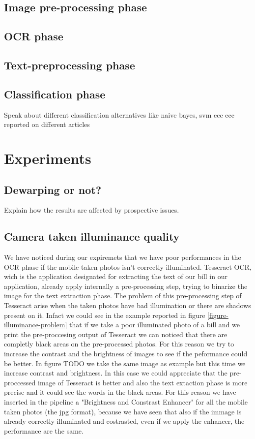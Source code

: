 \documentclass[10pt,twocolumn,letterpaper]{article}
\begin{document}
\subsection{Image pre-processing phase}

\subsection{OCR phase}

\subsection{Text-preprocessing phase}

\subsection{Classification phase}
Speak about different classification alternatives like naive bayes, svm ecc ecc reported on different  articles




\section{Experiments}

\subsection{Dewarping or not?}
Explain how the results are affected by prospective issues.

\subsection{Camera taken illuminance quality}
We have noticed during our expiremets that we have poor performances in the OCR phase if the mobile taken photos isn't correctly illuminated. Tesseract OCR, wich is the application designated for extracting the text of our bill in our application, already apply internally a pre-processing step, trying to binarize the image for the text extraction phase. The problem of this pre-processing step of Tesseract arise when the taken photos have bad illumination or there are shadows present on it. Infact we could see in the example reported in figure \ref{figure-illuminance-problem} that if we take a poor illuminated photo of a bill and we print the pre-proccesing output of Tesseract we can noticed that there are completly black areas on the pre-processed photos. For this reason we try to increase the contrast and the brightness of images to see if the peformance could be better. In figure TODO we take the same image as example but this time we increase contrast and brightness. In this case we could appreciate that the pre-proccessed image of Tesseract is better and also the text extaction phase is more precise and it could see the words in the black areas. For this reason we have inserted in the pipeline a "Brightness and Constrast Enhancer" for all the mobile taken photos (the jpg format), because we have seen that also if the immage is already correctly illuminated and costrasted, even if we apply the enhancer, the performance are the same.
\end{document}
